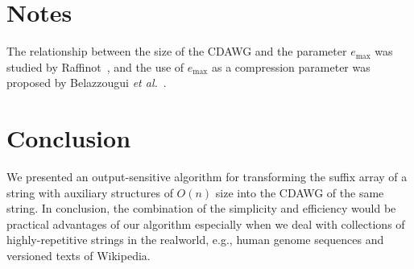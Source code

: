 \documentclass{article}
\begin{document}
\section{Notes}
\label{sec:notes}

The relationship between the size of the CDAWG and the parameter $e_{\max}$ was studied by Raffinot~\cite{raffinot2001maximal}, and the use of $e_{\max}$ as a compression parameter was proposed by Belazzougui \textit{et al.}~\cite{belazzougui:nunial:gagie:prezza:raffinot2015composite}.

\section{Conclusion}
\label{sec:concl}
We presented an output-sensitive algorithm for transforming the suffix array of a string with auxiliary structures of $O(n)$ size into the CDAWG of the same string. 
In conclusion, the combination of the simplicity and efficiency would be practical advantages of our algorithm especially when we deal with collections of highly-repetitive strings in the realworld, e.g., human genome sequences and versioned texts of Wikipedia. 



\newpage


\end{document}
